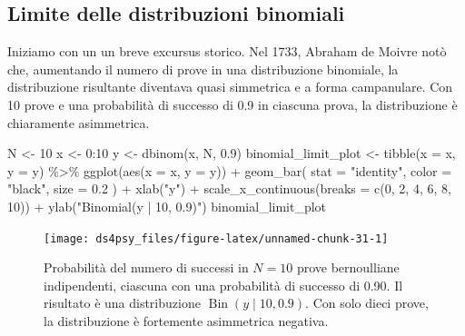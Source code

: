 \documentclass[
  11pt,
]{krantz}
\makeatletter
\newenvironment{Shaded}{\begin{snugshade}}{\end{snugshade}}
\newcommand{\AttributeTok}[1]{\textcolor[rgb]{0.61,0.61,0.61}{#1}}
\newcommand{\DecValTok}[1]{\textcolor[rgb]{0.06,0.06,0.06}{#1}}
\newcommand{\FloatTok}[1]{\textcolor[rgb]{0.06,0.06,0.06}{#1}}
\newcommand{\FunctionTok}[1]{\textcolor[rgb]{0,0,0}{#1}}
\newcommand{\NormalTok}[1]{#1}
\newcommand{\OtherTok}[1]{\textcolor[rgb]{0.37,0.37,0.37}{#1}}
\newcommand{\SpecialCharTok}[1]{\textcolor[rgb]{0,0,0}{#1}}
\newcommand{\StringTok}[1]{\textcolor[rgb]{0.5,0.5,0.5}{#1}}
\newenvironment{kframe}{%
\medskip{}
\setlength{\fboxsep}{.8em}
 \def\at@end@of@kframe{}%
 \ifinner\ifhmode%
  \def\at@end@of@kframe{\end{minipage}}%
  \begin{minipage}{\columnwidth}%
 \fi\fi%
 \def\FrameCommand##1{\hskip\@totalleftmargin \hskip-\fboxsep
 \colorbox{shadecolor}{##1}\hskip-\fboxsep
     \hskip-\linewidth \hskip-\@totalleftmargin \hskip\columnwidth}%
 \MakeFramed {\advance\hsize-\width
   \@totalleftmargin\z@ \linewidth\hsize
   \@setminipage}}%
 {\par\unskip\endMakeFramed%
 \at@end@of@kframe}
\renewenvironment{Shaded}{\begin{kframe}}{\end{kframe}}
\DeclareMathOperator{\Bin}{Bin} %
\theoremstyle{definition}
\theoremstyle{definition}
\theoremstyle{definition}
\theoremstyle{definition}
\theoremstyle{remark}
\makeatother
\begin{document}
\hypertarget{limite-delle-distribuzioni-binomiali}{%
\subsection{Limite delle distribuzioni binomiali}\label{limite-delle-distribuzioni-binomiali}}

Iniziamo con un un breve excursus storico. Nel 1733, Abraham de Moivre notò che, aumentando il numero di prove in una distribuzione binomiale, la distribuzione risultante diventava quasi simmetrica e a forma campanulare. Con 10 prove e una probabilità di successo di 0.9 in ciascuna prova, la distribuzione è chiaramente asimmetrica.

\begin{Shaded}
\begin{Highlighting}[]
\NormalTok{N }\OtherTok{\textless{}{-}} \DecValTok{10}
\NormalTok{x }\OtherTok{\textless{}{-}} \DecValTok{0}\SpecialCharTok{:}\DecValTok{10}
\NormalTok{y }\OtherTok{\textless{}{-}} \FunctionTok{dbinom}\NormalTok{(x, N, }\FloatTok{0.9}\NormalTok{)}
\NormalTok{binomial\_limit\_plot }\OtherTok{\textless{}{-}}
  \FunctionTok{tibble}\NormalTok{(}\AttributeTok{x =}\NormalTok{ x, }\AttributeTok{y =}\NormalTok{ y) }\SpecialCharTok{\%\textgreater{}\%}
  \FunctionTok{ggplot}\NormalTok{(}\FunctionTok{aes}\NormalTok{(}\AttributeTok{x =}\NormalTok{ x, }\AttributeTok{y =}\NormalTok{ y)) }\SpecialCharTok{+}
  \FunctionTok{geom\_bar}\NormalTok{(}
    \AttributeTok{stat =} \StringTok{"identity"}\NormalTok{, }\AttributeTok{color =} \StringTok{"black"}\NormalTok{, }\AttributeTok{size =} \FloatTok{0.2}
\NormalTok{  ) }\SpecialCharTok{+}
  \FunctionTok{xlab}\NormalTok{(}\StringTok{"y"}\NormalTok{) }\SpecialCharTok{+}
  \FunctionTok{scale\_x\_continuous}\NormalTok{(}\AttributeTok{breaks =} \FunctionTok{c}\NormalTok{(}\DecValTok{0}\NormalTok{, }\DecValTok{2}\NormalTok{, }\DecValTok{4}\NormalTok{, }\DecValTok{6}\NormalTok{, }\DecValTok{8}\NormalTok{, }\DecValTok{10}\NormalTok{)) }\SpecialCharTok{+}
  \FunctionTok{ylab}\NormalTok{(}\StringTok{"Binomial(y | 10, 0.9)"}\NormalTok{)}
\NormalTok{binomial\_limit\_plot}
\end{Highlighting}
\end{Shaded}

\begin{figure}[h]

{\centering \texttt{[image: ds4psy\_files/figure-latex/unnamed-chunk-31-1]} 

}

\caption{Probabilità del numero di successi in $N = 10$ prove bernoulliane indipendenti, ciascuna con una probabilità di successo di 0.90. Il risultato è una distribuzione $\Bin(y \mid 10, 0.9)$. Con solo dieci prove, la distribuzione è fortemente asimmetrica negativa.}\label{fig:unnamed-chunk-31}
\end{figure}
\end{document}
